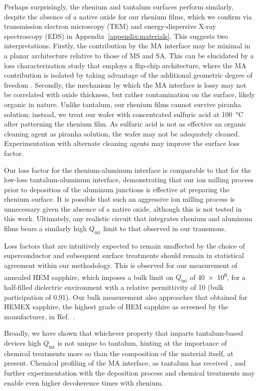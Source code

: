 \documentclass[
    reprint,
    superscriptaddress,
    amsmath,amssymb,
    aps,
    prb,
    floatfix,
]{revtex4-2}
\begin{document}
Perhaps surprisingly, the rhenium and tantalum surfaces perform similarly, despite the absence of a native oxide for our rhenium films, which we confirm via transmission electron microscopy (TEM) and energy-dispersive X-ray spectroscopy (EDS) in Appendix~\ref{appendix:materials}. This suggests two interpretations. Firstly, the contribution by the MA interface may be minimal in a planar architecture relative to those of MS and SA. This can be elucidated by a loss characterization study that employs a flip-chip architecture, where the MA contribution is isolated by taking advantage of the additional geometric degree of freedom \cite{ganjam2024a}. Secondly, the mechanism by which the MA interface is lossy may not be correlated with oxide thickness, but rather contamination on the surface, likely organic in nature. Unlike tantalum, our rhenium films cannot survive piranha solution; instead, we treat our wafer with concentrated sulfuric acid at \SI{100}{\celsius} after patterning the rhenium film. As sulfuric acid is not as effective an organic cleaning agent as piranha solution, the wafer may not be adequately cleaned. Experimentation with alternate cleaning agents may improve the surface loss factor.

Our loss factor for the rhenium-aluminum interface is comparable to that for the low-loss tantalum-aluminum interface, demonstrating that our ion milling process prior to deposition of the aluminum junctions is effective at preparing the rhenium surface. It is possible that such an aggressive ion milling process is unnecessary given the absence of a native oxide, although this is not tested in this work. Ultimately, any realistic circuit that integrates rhenium and aluminum films bears a similarly high $Q_\mathrm{int}$ limit to that observed in our transmons.

Loss factors that are intuitively expected to remain unaffected by the choice of superconductor and subsequent surface treatments should remain in statistical agreement within our methodology. This is observed for our measurement of annealed HEM sapphire, which imposes a bulk limit on $Q_\mathrm{int}$ of \num{40e6}, for a half-filled dielectric environment with a relative permittivity of 10 (bulk participation of 0.91). Our bulk measurement also approaches that obtained for HEMEX sapphire, the highest grade of HEM sapphire as screened by the manufacturer, in Ref.~\cite{read2023}.

Broadly, we have shown that whichever property that imparts tantalum-based devices high $Q_\mathrm{int}$ is not unique to tantalum, hinting at the importance of chemical treatments more so than the composition of the material itself, at present. Chemical profiling of the MA interface, as tantalum has received \cite{mclellan2023}, and further experimentation with the deposition process and chemical treatments may enable even higher decoherence times with rhenium.
\end{document}
